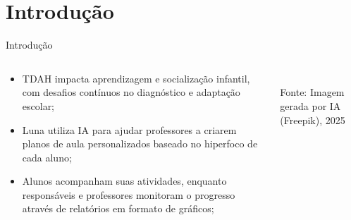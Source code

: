 \documentclass{beamer}
\begin{document}
\section{Introdução}
\begin{frame}{Introdução}
    \begin{columns}
        \begin{column}{0.6\textwidth}
    \justifying
    \begin{itemize}
        \item TDAH impacta aprendizagem e socialização infantil, com desafios contínuos no diagnóstico e adaptação escolar;
        
        \item Luna utiliza IA para ajudar professores a criarem planos de aula personalizados baseado  no hiperfoco de cada aluno;
        
        \item Alunos acompanham suas atividades, enquanto responsáveis e professores monitoram o progresso através de relatórios em formato de gráficos;
    \end{itemize}
\end{column}
        
        \begin{column}{0.35\textwidth}
            \centering
            \\[0.3cm]
            \tiny\textcolor{cpsgray}{Fonte: Imagem gerada por IA (Freepik), 2025}
        \end{column}
    \end{columns}
\end{frame}
\end{document}
